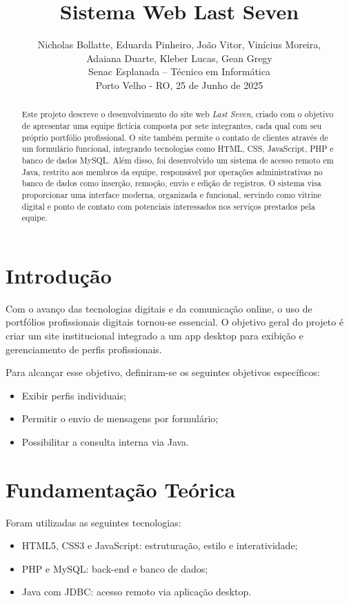 \documentclass[12pt]{article}
\title{\textbf{Sistema Web Last Seven}}
\author{
    Nicholas Bollatte, Eduarda Pinheiro, João Vitor, Vinícius Moreira,\\
    Adaiana Duarte, Kleber Lucas, Gean Gregy\\
    Senac Esplanada – Técnico em Informática\\
    Porto Velho - RO, 25 de Junho de 2025
}
\date{}
\begin{document}
\maketitle
\thispagestyle{empty}

\begin{abstract}
Este projeto descreve o desenvolvimento do site web \textit{Last Seven}, criado com o objetivo de apresentar uma equipe fictícia composta por sete integrantes, cada qual com seu próprio portfólio profissional. O site também permite o contato de clientes através de um formulário funcional, integrando tecnologias como HTML, CSS, JavaScript, PHP e banco de dados MySQL. Além disso, foi desenvolvido um sistema de acesso remoto em Java, restrito aos membros da equipe, responsável por operações administrativas no banco de dados como inserção, remoção, envio e edição de registros. O sistema visa proporcionar uma interface moderna, organizada e funcional, servindo como vitrine digital e ponto de contato com potenciais interessados nos serviços prestados pela equipe.
\end{abstract}

\section{Introdução}
Com o avanço das tecnologias digitais e da comunicação online, o uso de portfólios profissionais digitais tornou-se essencial.
O objetivo geral do projeto é criar um site institucional integrado a um app desktop para exibição e gerenciamento de perfis profissionais.

Para alcançar esse objetivo, definiram-se os seguintes objetivos específicos:
\begin{itemize}
    \item Exibir perfis individuais;
    \item Permitir o envio de mensagens por formulário;
    \item Possibilitar a consulta interna via Java.
\end{itemize}

\section{Fundamentação Teórica}
Foram utilizadas as seguintes tecnologias:
\begin{itemize}
    \item HTML5, CSS3 e JavaScript: estruturação, estilo e interatividade;
    \item PHP e MySQL: back-end e banco de dados;
    \item Java com JDBC: acesso remoto via aplicação desktop.
\end{itemize}
\end{document}
